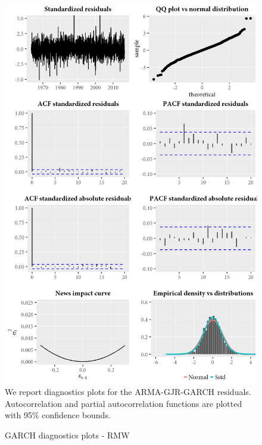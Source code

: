 \begin{figure}[H]
  \caption{GARCH diagnostics plots - RMW}
  \label{diag:garchdiagRMW}
  \toprule
  \centering
  \begin{minipage}{\textwidth}
  \includegraphics[scale=1]{graphics/garch/garch_diagnosticsRMW.png}  
  \bottomrule
  \vspace{3mm}
  \footnotesize
  We report diagnostics plots for the ARMA-GJR-GARCH residuals. Autocorrelation and partial autocorrelation functions are plotted with 95\% confidence bounds.
  \end{minipage}
\end{figure}
